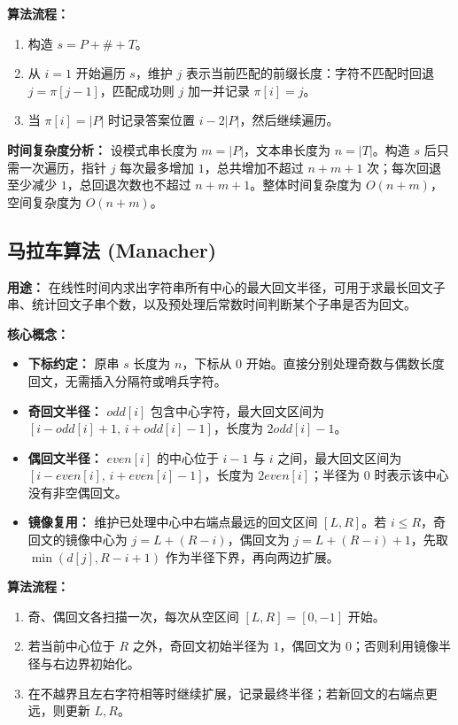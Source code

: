 \textbf{算法流程：}
\begin{enumerate}
  \item 构造 $s = P + \# + T$。
  \item 从 $i=1$ 开始遍历 $s$，维护 $j$ 表示当前匹配的前缀长度：字符不匹配时回退 $j = \pi[j-1]$，匹配成功则 $j$ 加一并记录 $\pi[i] = j$。
  \item 当 $\pi[i] = |P|$ 时记录答案位置 $i - 2|P|$，然后继续遍历。
\end{enumerate}

\textbf{时间复杂度分析：}
设模式串长度为 $m = |P|$，文本串长度为 $n = |T|$。构造 $s$ 后只需一次遍历，指针 $j$ 每次最多增加 $1$，总共增加不超过 $n+m+1$ 次；每次回退至少减少 $1$，总回退次数也不超过 $n+m+1$。整体时间复杂度为 $O(n + m)$，空间复杂度为 $O(n + m)$。



\subsection{马拉车算法 (Manacher)}

\textbf{用途：} 在线性时间内求出字符串所有中心的最大回文半径，可用于求最长回文子串、统计回文子串个数，以及预处理后常数时间判断某个子串是否为回文。

\textbf{核心概念：}
\begin{itemize}
  \item \textbf{下标约定：} 原串 $s$ 长度为 $n$，下标从 $0$ 开始。直接分别处理奇数与偶数长度回文，无需插入分隔符或哨兵字符。
  \item \textbf{奇回文半径：} $odd[i]$ 包含中心字符，最大回文区间为 $[i-odd[i]+1,\,i+odd[i]-1]$，长度为 $2odd[i]-1$。
  \item \textbf{偶回文半径：} $even[i]$ 的中心位于 $i-1$ 与 $i$ 之间，最大回文区间为 $[i-even[i],\,i+even[i]-1]$，长度为 $2even[i]$；半径为 $0$ 时表示该中心没有非空偶回文。
  \item \textbf{镜像复用：} 维护已处理中心中右端点最远的回文区间 $[L,R]$。若 $i\le R$，奇回文的镜像中心为 $j=L+(R-i)$，偶回文为 $j=L+(R-i)+1$，先取 $\min(d[j],R-i+1)$ 作为半径下界，再向两边扩展。
\end{itemize}

\textbf{算法流程：}
\begin{enumerate}
  \item 奇、偶回文各扫描一次，每次从空区间 $[L,R]=[0,-1]$ 开始。
  \item 若当前中心位于 $R$ 之外，奇回文初始半径为 $1$，偶回文为 $0$；否则利用镜像半径与右边界初始化。
  \item 在不越界且左右字符相等时继续扩展，记录最终半径；若新回文的右端点更远，则更新 $L,R$。
\end{enumerate}

